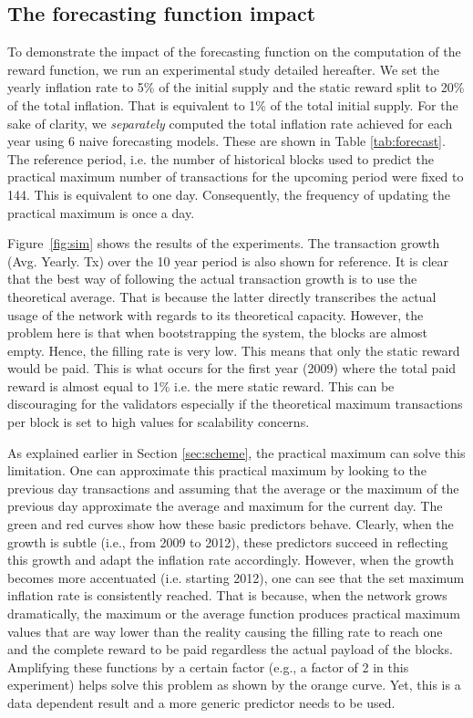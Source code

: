 \documentclass[]{article}
\begin{document}
\subsection{The forecasting function impact}
To demonstrate the impact of the forecasting function on the computation of the reward function, we run an experimental study detailed hereafter. We set the yearly inflation rate to 5\% of the initial supply and the static reward split to 20\% of the total inflation. That is equivalent to 1\% of the total initial supply. For the sake of clarity, we \emph{separately} computed the total inflation rate achieved for each year using 6 naive forecasting models. These are shown in Table \ref{tab:forecast}. The reference period, i.e. the number of historical blocks used to predict the practical maximum number of transactions for the upcoming period were fixed to 144. This is equivalent to one day. Consequently, the frequency of updating the practical maximum is once a day.

Figure~\ref{fig:sim} shows the results of the experiments. The transaction growth (Avg. Yearly. Tx) over the 10 year period is also shown for reference. It is clear that the best way of following the actual transaction growth is to use the theoretical average. That is because the latter directly transcribes the actual usage of the network with regards to its theoretical capacity. However, the problem here is that when bootstrapping the system, the blocks are almost empty. Hence, the filling rate is very low. This means that only the static reward would be paid. This is what occurs for the first year (2009) where the total paid reward is almost equal to 1\% i.e. the mere static reward. This can be discouraging for the validators especially if the theoretical maximum transactions per block is set to high values for scalability concerns.

As explained earlier in Section \ref{sec:scheme}, the practical maximum can solve this limitation. One can approximate this practical maximum by looking to the previous day transactions and assuming that the average or the maximum of the previous day approximate the average and maximum for the current day. The green and red curves show how these basic predictors behave. Clearly, when the growth is subtle (i.e., from 2009 to 2012), these predictors succeed in reflecting this growth and adapt the inflation rate accordingly. However, when the growth becomes more accentuated (i.e. starting 2012), one can see that the set maximum inflation rate is consistently reached. That is because, when the network grows dramatically, the maximum or the average function produces practical maximum values that are way lower than the reality causing the filling rate to reach one and the complete reward to be paid regardless the actual payload of the blocks. Amplifying these functions by a certain factor (e.g., a factor of 2 in this experiment) helps solve this problem as shown by the orange curve. Yet, this is a data dependent result and a more generic predictor needs to be used.
\end{document}
